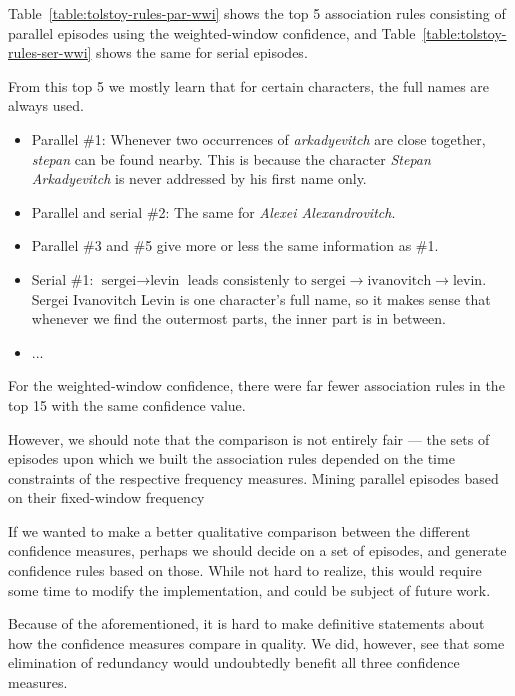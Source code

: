 Table~\ref{table:tolstoy-rules-par-wwi} shows the top 5 association rules consisting of parallel episodes using the weighted-window confidence, and Table~\ref{table:tolstoy-rules-ser-wwi} shows the same for serial episodes.

From this top 5 we mostly learn that for certain characters, the full names are always used.

\begin{itemize}
\item Parallel \#1: Whenever two occurrences of \emph{arkadyevitch} are close together, \emph{stepan} can be found nearby. This is because the character \emph{Stepan Arkadyevitch} is never addressed by his first name only.
\item Parallel and serial \#2: The same for \emph{Alexei Alexandrovitch}.
\item Parallel \#3 and \#5 give more or less the same information as \#1.
\item Serial \#1: $ \text{sergei} \to \text{levin} $ leads consistenly to $ \text{sergei} \to \text{ivanovitch} \to \text{levin} $. Sergei Ivanovitch Levin is one character's full name, so it makes sense that whenever we find the outermost parts, the inner part is in between.
\item ...
\end{itemize}

For the weighted-window confidence, there were far fewer association rules in the top 15 with the same confidence value.

However, we should note that the comparison is not entirely fair --- the sets of episodes upon which we built the association rules depended on the time constraints of the respective frequency measures. Mining parallel episodes based on their fixed-window frequency

If we wanted to make a better qualitative comparison between the different confidence measures, perhaps we should decide on a set of episodes, and generate confidence rules based on those. While not hard to realize, this would require some time to modify the implementation, and could be subject of future work.

Because of the aforementioned, it is hard to make definitive statements about how the confidence measures compare in quality. We did, however, see that some elimination of redundancy would undoubtedly benefit all three confidence measures.

